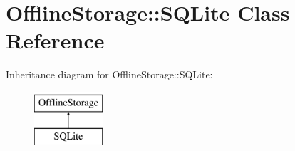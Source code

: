 \hypertarget{class_d_jabberd_1_1_delivery_1_1_offline_storage_1_1_s_q_lite}{
\section{\-Offline\-Storage\-:\-:\-S\-Q\-Lite \-Class \-Reference}
\label{class_d_jabberd_1_1_delivery_1_1_offline_storage_1_1_s_q_lite}
}
\-Inheritance diagram for \-Offline\-Storage\-:\-:\-S\-Q\-Lite\-:\begin{figure}[H]
\begin{center}
\leavevmode
\includegraphics[height=2.000000cm]{class_d_jabberd_1_1_delivery_1_1_offline_storage_1_1_s_q_lite}
\end{center}
\end{figure}
